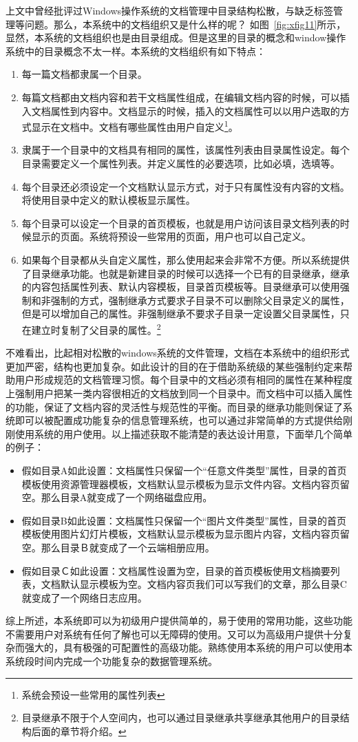 上文中曾经批评过Windows操作系统的文档管理中目录结构松散，与缺乏标签管理等问题。那么，本系统中的文档组织又是什么样的呢？ 如图~\ref{fig:xfig11}所示，显然，本系统的文档组织也是由目录组成。但是这里的目录的概念和window操作系统中的目录概念不太一样。本系统的文档组织有如下特点：
\begin{enumerate}
\item 每一篇文档都隶属一个目录。
\item 每篇文档都由文档内容和若干文档属性组成，在编辑文档内容的时候，可以插入文档属性到内容中。文档显示的时候，插入的文档属性可以以用户选取的方式显示在文档中。文档有哪些属性由用户自定义\footnote{系统会预设一些常用的属性列表}。
\item 隶属于一个目录中的文档具有相同的属性，该属性列表由目录属性设定。每个目录需要定义一个属性列表。并定义属性的必要选项，比如必填，选填等。
\item 每个目录还必须设定一个文档默认显示方式，对于只有属性没有内容的文档。将使用目录中定义的默认模板显示属性。
\item 每个目录可以设定一个目录的首页模板，也就是用户访问该目录文档列表的时候显示的页面。系统将预设一些常用的页面，用户也可以自己定义。
\item 如果每个目录都从头自定义属性，那么使用起来会非常不方便。所以系统提供了目录继承功能。也就是新建目录的时候可以选择一个已有的目录继承，继承的内容包括属性列表、默认内容模板，目录首页模板等。目录继承可以使用强制和非强制的方式，强制继承方式要求子目录不可以删除父目录定义的属性，但是可以增加自己的属性。非强制继承不要求子目录一定设置父目录属性，只在建立时复制了父目录的属性。\footnote{目录继承不限于个人空间内，也可以通过目录继承共享继承其他用户的目录结构后面的章节将介绍。}
\end{enumerate}

不难看出，比起相对松散的windows系统的文件管理，文档在本系统中的组织形式更加严密，结构也更加复杂。如此设计的目的在于借助系统级的某些强制约定来帮助用户形成规范的文档管理习惯。每个目录中的文档必须有相同的属性在某种程度上强制用户把某一类内容很相近的文档放到同一个目录中。而文档中可以插入属性的功能，保证了文档内容的灵活性与规范性的平衡。而目录的继承功能则保证了系统即可以被配置成功能复杂的信息管理系统，也可以通过非常简单的方式提供给刚刚使用系统的用户使用。以上描述获取不能清楚的表达设计用意，下面举几个简单的例子：
\begin{itemize}
\item 假如目录A如此设置：文档属性只保留一个“任意文件类型”属性，目录的首页模板使用资源管理器模板，文档默认显示模板为显示文件内容。文档内容页留空。那么目录A就变成了一个网络磁盘应用。
\item 假如目录B如此设置：文档属性只保留一个“图片文件类型”属性，目录的首页模板使用图片幻灯片模板，文档默认显示模板为显示图片内容，文档内容页留空。那么目录Ｂ就变成了一个云端相册应用。
\item 假如目录Ｃ如此设置：文档属性设置为空，目录的首页模板使用文档摘要列表，文档默认显示模板为空。文档内容页我们可以写我们的文章，那么目录C就变成了一个网络日志应用。
\end{itemize}
综上所述，本系统即可以为初级用户提供简单的，易于使用的常用功能，这些功能不需要用户对系统有任何了解也可以无障碍的使用。又可以为高级用户提供十分复杂而强大的，具有极强的可配置性的高级功能。熟练使用本系统的用户可以使用本系统段时间内完成一个功能复杂的数据管理系统。

